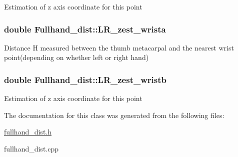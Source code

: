 Estimation of z axis coordinate for this point \hypertarget{classFullhand__dist_aa072dcf4e7fde28f7ca997426f42897b}{
\subsubsection[{LR\_\-zest\_\-wrista}]{\setlength{\rightskip}{0pt plus 5cm}double {\bf Fullhand\_\-dist::LR\_\-zest\_\-wrista}}}
\label{classFullhand__dist_aa072dcf4e7fde28f7ca997426f42897b}
Distance H measured between the thumb metacarpal and the nearest wrist point(depending on whether left or right hand) \hypertarget{classFullhand__dist_a11a09aca9e340d66fccaf6424eb7b06f}{
\subsubsection[{LR\_\-zest\_\-wristb}]{\setlength{\rightskip}{0pt plus 5cm}double {\bf Fullhand\_\-dist::LR\_\-zest\_\-wristb}}}
\label{classFullhand__dist_a11a09aca9e340d66fccaf6424eb7b06f}
Estimation of z axis coordinate for this point 

The documentation for this class was generated from the following files:\begin{DoxyCompactItemize}
\item 
\hyperlink{fullhand__dist_8h}{fullhand\_\-dist.h}\item 
fullhand\_\-dist.cpp\end{DoxyCompactItemize}
